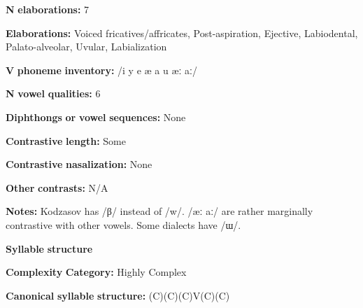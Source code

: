 \begin{styleBody}
\textbf{N} \textbf{elaborations:} 7
\end{styleBody}

\begin{styleBody}
\textbf{Elaborations:} Voiced fricatives/affricates, Post-aspiration, Ejective, Labiodental, Palato-alveolar, Uvular, Labialization
\end{styleBody}

\begin{styleBody}
\textbf{V} \textbf{phoneme} \textbf{inventory:} /i y e æ a u æː aː/
\end{styleBody}

\begin{styleBody}
\textbf{N} \textbf{vowel} \textbf{qualities:} 6
\end{styleBody}

\begin{styleBody}
\textbf{Diphthongs} \textbf{or} \textbf{vowel} \textbf{sequences:} None
\end{styleBody}

\begin{styleBody}
\textbf{Contrastive} \textbf{length:} Some
\end{styleBody}

\begin{styleBody}
\textbf{Contrastive} \textbf{nasalization:} None
\end{styleBody}

\begin{styleBody}
\textbf{Other} \textbf{contrasts:} N/A
\end{styleBody}

\begin{styleBody}
\textbf{Notes:} Kodzasov has /β/ instead of /w/. /æː aː/ are rather marginally contrastive with other vowels. Some dialects have /ɯ/.
\end{styleBody}

\begin{styleBody}
\textbf{Syllable} \textbf{structure}
\end{styleBody}

\begin{styleBody}
\textbf{Complexity} \textbf{Category:} Highly Complex
\end{styleBody}

\begin{styleBody}
\textbf{Canonical} \textbf{syllable} \textbf{structure:} (C)(C)(C)V(C)(C) \citep[40-46]{Haspelmath1993}
\end{styleBody}

